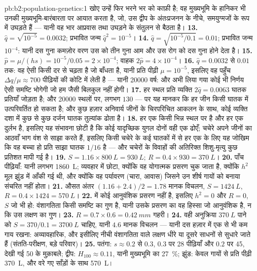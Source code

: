 \begin{solution}{pb:b2:population-genetics:1}
खोए उन्हें फिर भरने भर को काफ़ी है; वह मुख्यभूमि के
हानिकर  भी उनकी मुख्यभूमि-बारंबारता पर आयात करता है, जो,
उस द्वीप के अंतःप्रजनन के नीचे, समयुग्मजों के रूप में उघड़ते हैं --- यानी वह
भार आप्रवास तथा उघड़ने के संतुलन से बैठता है।
\textbf{13.} $\hat q = \sqrt{10^{-5}} = 0.0032$; प्रभावित जन्म $\hat
q^{2} = 10^{-5}$।
\textbf{14.} $\hat q = \sqrt{10^{-5}/0.1} = 0.01$; प्रभावित जन्म
$10^{-4}$: यानी दस गुना कमज़ोर वरण उस  को तीन
गुना आम और उस रोग को दस गुना होने देता है।
\textbf{15.} $\hat p = \mu/(hs) = 10^{-5}/0.05 = 2\times 10^{-4}$;
वाहक $2\hat p = 4\times 10^{-4}$।
\textbf{16.} $\hat q = 0.0032$ से $0.01$ तक: वह  ऐसी किसी
दर से चढ़ता है जो  बाँधता है, यानी प्रति पीढ़ी $\mu = 10^{-5}$, इसलिए वह
पहुँच $\Delta q/\mu \approx 700$ पीढ़ियों की कोटि में लेती है ---
यानी \num{20000} वर्ष: और अभी लिया गया कोई भी निर्णय ऐसी समष्टि
भोगेगी जो हम जैसी बिलकुल नहीं होगी।
\textbf{17.} हर स्थल प्रति व्यक्ति $2\hat q = 0.0063$ घातक प्रतियाँ
जोड़ता है; और \num{20000} स्थलों पर, लगभग $130$ --- पर यह मानकर कि
हर जीन किसी  घातक में उत्परिवर्तित हो सकता है; और कुछ हज़ार
अनिवार्य जीनों के चिरपरिचित आकलन के साथ, कोई व्यक्ति  दशा में
कुछ से कुछ दर्जन घातक तुल्यांक ढोता है।
\textbf{18.} हर एक किसी भिन्न स्थल पर है और हर एक दुर्लभ है, इसलिए यह
संभावना छोटी है कि कोई यादृच्छिक युगल दोनों वही एक ढोएँ;
चचेरे अपने जीनों का आठवाँ भाग वंश से साझा करते हैं, इसलिए किसी
चचेरे के कई घातकों में से हर एक के लिए यह जोखिम कि वह बच्चा  हो
प्रति साझा घातक $1/16$ है --- और चचेरों के विवाहों की अतिरिक्त
शिशु-मृत्यु कुछ प्रतिशत मापी गई है।
\textbf{19.} $S = 1.16\times \qty{800}{L} = \qty{930}{L}$; $R = 0.4\times
930 = \qty{370}{L}$।
\textbf{20.} पाँच पीढ़ियाँ: यानी लगभग \qty{1860}{L}; व्यवहार में छोटा,
क्योंकि वह योगात्मक प्रसरण चुक जाता है, क्योंकि $h^{2}$
मूल झुंड में आँकी गई थी, और क्योंकि वह पर्यावरण
(चारा, आवास) जिसने उन शीर्ष गायों को बनाया संचरित नहीं होता।
\textbf{21.} औसत अंतर $(1.16 + 2.4)/2 = 1.78$ मानक
विचलन, $S = \qty{1424}{L}$, $R = 0.4\times 1424 = \qty{570}{L}$।
\textbf{22.}  में कोई आनुवंशिक प्रसरण नहीं है, इसलिए $h^{2} = 0$ और $R =
0$, $S$ जो भी हो: वंशागतिता किसी समष्टि का गुण है, यानी
उसके प्रसरण का वह हिस्सा जो आनुवंशिक है, न कि उस लक्षण का गुण।
\textbf{23.} $R = 0.7\times 0.6 = \qty{0.42}{mm}$ गहरी।
\textbf{24.} वही अनुक्रिया $\qty{370}{L}$ पाने को $S = 370/0.1 =
\qty{3700}{L}$ चाहिए, यानी $4.6$ मानक विचलन --- यानी दस हज़ार में
एक से भी कम गाय रखना: अव्यावहारिक, और इसीलिए
नीची वंशागतिता वाले लक्षण धीरे या दूसरे साधनों से सुधारे जाते हैं
(संतति-परीक्षण, बड़े परिवार)।
\textbf{25.} पतंगा: $s \approx 0.2$ से $0.3$, $0.3$ पर 28 पीढ़ियाँ
और $0.2$ पर 45, देखी गई 50 के मुक़ाबले; द्वीप: $H_{100} \approx 0.11$,
यानी मुख्यभूमि का \qty{27}{\%}; झुंड: केवल गायों से प्रति पीढ़ी \qty{370}{L},
और वरे गए साँड़ों के साथ \qty{570}{L}।
\end{solution}
